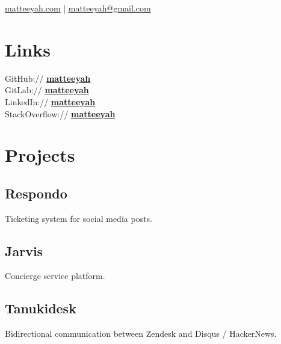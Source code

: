 \documentclass[]{matija-resume}
\begin{document}
%
%
\lastupdated

%
%
 {
\href{https://matteeyah.com}{matteeyah.com} |
\href{mailto:matteeyah@gmail.com}{matteeyah@gmail.com}
}

%
%

\begin{minipage}[t]{0.33\textwidth}



\section{Links}
GitHub:// \href{https://github.com/matteeyah}{\bf matteeyah \faExternalLink} \\
GitLab:// \href{https://gitlab.com/matteeyah}{\bf matteeyah \faExternalLink} \\
LinkedIn://  \href{https://www.linkedin.com/in/matteeyah}{\bf matteeyah \faExternalLink} \\
StackOverflow://  \href{https://stackoverflow.com/users/1139722/matteeyah}{\bf matteeyah \faExternalLink}


\section{Projects}
\subsection{Respondo}
Ticketing system for social media posts.
\sectionsep

\subsection{Jarvis}
Concierge service platform.
\sectionsep

\subsection{Tanukidesk}
Bidirectional communication between Zendesk and Disqus / HackerNews.
\sectionsep


\end{minipage}
\end{document}
